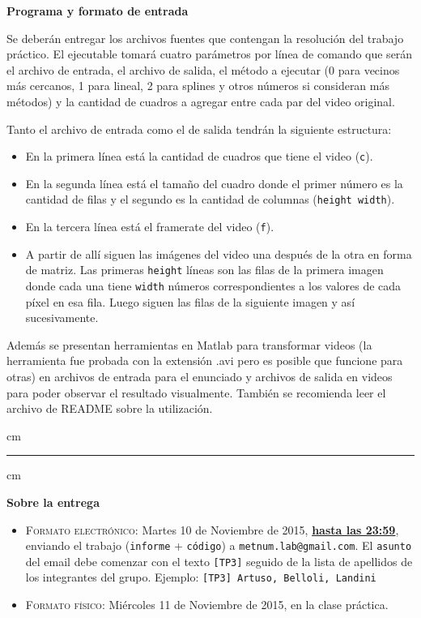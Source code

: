 {\bf\noindent Programa y formato de entrada}

Se deberán entregar los archivos fuentes que contengan la resolución del trabajo práctico. El ejecutable tomará cuatro parámetros por línea de comando que serán el archivo de entrada, el archivo de salida, el método a ejecutar (0 para vecinos más cercanos, 1 para lineal, 2 para splines y otros números si consideran más métodos) y la cantidad de cuadros a agregar entre cada par del video original.

Tanto el archivo de entrada como el de salida tendrán la siguiente estructura:

\begin{itemize}
  \item En la primera línea está la cantidad de cuadros que tiene el video (\verb|c|).
  \item En la segunda línea está el tamaño del cuadro donde el primer número es la cantidad de filas y el segundo es la cantidad de columnas (\verb|height width|).
  \item En la tercera línea está el framerate del video (\verb|f|).
  \item A partir de allí siguen las imágenes del video una después de la otra en forma de matriz. Las primeras \verb|height| l\'ineas son las filas de la primera imagen donde cada una tiene \verb|width| n\'umeros correspondientes a los valores de cada píxel en esa fila. Luego siguen las filas de la siguiente imagen y as\'i sucesivamente.
\end{itemize}

Además se presentan herramientas en Matlab para transformar videos (la herramienta fue probada con la extensión .avi pero es posible que funcione para otras) en archivos de entrada para el enunciado y archivos de salida en videos para poder observar el resultado visualmente. También se recomienda leer el archivo de README sobre la utilización.


 cm
\hrule
{} cm

{\bf Sobre la entrega}
\begin{itemize}
\item \textsc{Formato electr\'onico:} Martes 10 de Noviembre de 2015, {\bf{\underline{hasta las 23:59}}}, enviando el trabajo
(\texttt{informe} + \texttt{c\'odigo}) a \texttt{metnum.lab@gmail.com}. El \texttt{asunto} del email debe comenzar con el texto \verb|[TP3]| seguido
de la lista de apellidos de los integrantes del grupo. Ejemplo: \texttt{[TP3] Artuso, Belloli, Landini}
\item \textsc{Formato f\'isico:} Mi\'ercoles 11 de Noviembre de 2015, en la clase pr\'actica.
\end{itemize}